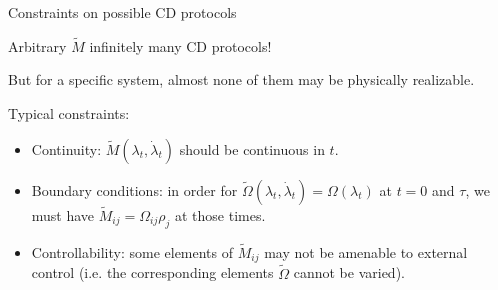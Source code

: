 \documentclass{beamer}
\begin{document}
\begin{frame}{Constraints on possible CD protocols}

  Arbitrary $\tilde{M}$ \quad \Rightarrow \quad infinitely many CD protocols!

  \vspace{1em}
  \pause

  But for a specific system, almost none of them may be physically realizable.

  \pause

  \vspace{1em} {\color{red} Typical constraints:}

  \begin{itemize}
  \item {\color{blue} Continuity:} $\tilde{M}(\lambda_t,\dot\lambda_t)$ should be
    continuous in $t$.
    \vspace{0.25em}
    \pause

  \item {\color{blue} Boundary conditions:}  in order for $\tilde{\Omega}(\lambda_t,\dot\lambda_t) = \Omega(\lambda_t)$ at $t=0$ and $\tau$, we must have $\tilde{M}_{ij} = \Omega_{ij}\rho_j$ at those times.
    \vspace{0.25em}
    \pause


  \item {\color{blue} Controllability:} some elements of
    $\tilde{M}_{ij}$ may not be amenable to external control (i.e. the
    corresponding elements $\tilde{\Omega}$ cannot be varied).
  \end{itemize}

\end{frame}
\end{document}
